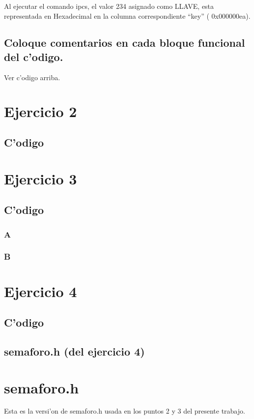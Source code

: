 \documentclass[a4paper,11pt]{article}
\newcommand{\?}{?`}
\begin{document}
Al ejecutar el comando ipcs, el valor 234 asignado como LLAVE, esta representada en Hexadecimal en la columna correspondiente ``key'' ( 0x000000ea).

\subsection[Punto F]{Coloque comentarios en cada bloque funcional del c'odigo.}

Ver c'odigo arriba.

\section{Ejercicio 2}
\subsection{C'odigo}


\section{Ejercicio 3}
\subsection{C'odigo}
\subsubsection{A}


\subsubsection{B}


\section{Ejercicio 4}
\subsection{C'odigo}


\subsection{semaforo.h (del ejercicio 4)}


\appendix
\section{semaforo.h}
Esta es la versi'on de semaforo.h usada en los puntos 2 y 3 del presente trabajo.

\end{document}
